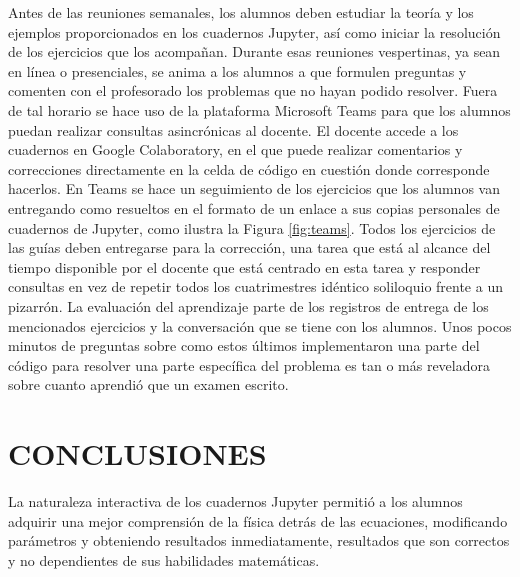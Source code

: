 \documentclass[a4paper]{fodami}        %
\begin{document}
Antes de las reuniones semanales, los alumnos deben estudiar la teoría y los ejemplos proporcionados en los cuadernos Jupyter, así como iniciar la resolución de los ejercicios que los acompañan.
Durante esas reuniones vespertinas, ya sean en línea o presenciales, se anima a los alumnos a que formulen preguntas y comenten con el profesorado los problemas que no hayan podido resolver.
Fuera de tal horario se hace uso de la plataforma Microsoft Teams para que los alumnos puedan realizar consultas asincrónicas al docente.
El docente accede a los cuadernos en Google Colaboratory, en el que puede realizar comentarios y correcciones directamente en la celda de código en cuestión donde corresponde hacerlos.
En Teams se hace un seguimiento de los ejercicios que los alumnos van entregando como resueltos en el formato de un enlace a sus copias personales de cuadernos de Jupyter, como ilustra la Figura \ref{fig:teams}.
Todos los ejercicios de las guías deben entregarse para la corrección, una tarea que está al alcance del tiempo disponible por el docente que está centrado en esta tarea y responder consultas en vez de repetir todos los cuatrimestres idéntico soliloquio frente a un pizarrón.
La evaluación del aprendizaje parte de los registros de entrega de los mencionados ejercicios y la conversación que se tiene con los alumnos.
Unos pocos minutos de preguntas sobre como estos últimos implementaron una parte del código para resolver una parte específica del problema es tan o más reveladora sobre cuanto aprendió que un examen escrito.





\section{CONCLUSIONES}

La naturaleza interactiva de los cuadernos Jupyter permitió a los alumnos adquirir una mejor comprensión de la física detrás de las ecuaciones, modificando parámetros y obteniendo resultados inmediatamente, resultados que son correctos y no dependientes de sus habilidades matemáticas.\par\medskip
\end{document}
